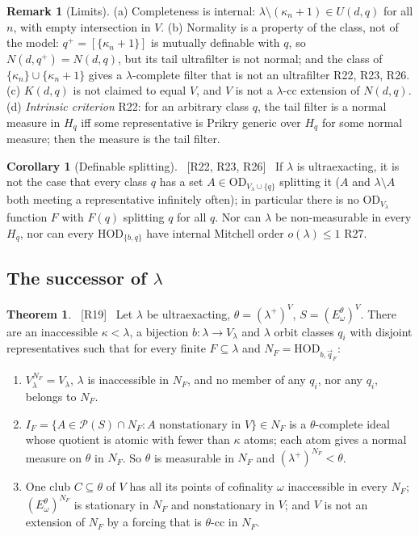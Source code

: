 \documentclass[11pt,letterpaper]{article}
\theoremstyle{definition}
\newtheorem{theorem}[definition]{Theorem}
\newtheorem{corollary}[definition]{Corollary}
\newtheorem{remark}[definition]{Remark}
\numberwithin{equation}{section}
\newcommand{\HOD}{\mathrm{HOD}}
\newcommand{\OD}{\mathrm{OD}}
\newcommand{\Pow}{\mathcal P}
\newcommand{\src}[1]{\unskip\ {\normalfont\small\sffamily\color{Olive}[#1]}\ }
\newcommand{\R}[1]{\textsf{R#1}}
\begin{document}
\begin{remark}[Limits]\label{rem:corelimits}
(a) Completeness is internal: $\lambda\setminus(\kappa_n+1)\in U(d,q)$ for all $n$, with empty intersection in $V$. (b) Normality is a property of the class, not of the model: $q^+=[\{\kappa_n+1\}]$ is mutually definable with $q$, so $N(d,q^+)=N(d,q)$, but its tail ultrafilter is not normal; and the class of $\{\kappa_n\}\cup\{\kappa_n+1\}$ gives a $\lambda$-complete filter that is not an ultrafilter \R{22}, \R{23}, \R{26}. (c) $K(d,q)$ is not claimed to equal $V$, and $V$ is not a $\lambda$-cc extension of $N(d,q)$. (d) \emph{Intrinsic criterion} \R{22}: for an arbitrary class $q$, the tail filter is a normal measure in $H_q$ iff some representative is Prikry generic over $H_q$ for some normal measure; then the measure is the tail filter.
\end{remark}

\begin{corollary}[Definable splitting]\label{cor:split}\src{R22, R23, R26}
If $\lambda$ is ultraexacting, it is not the case that every class $q$ has a set $A\in\OD_{V_\lambda\cup\{q\}}$ splitting it ($A$ and $\lambda\setminus A$ both meeting a representative infinitely often); in particular there is no $\OD_{V_\lambda}$ function $F$ with $F(q)$ splitting $q$ for all $q$. Nor can $\lambda$ be non-measurable in every $H_q$, nor can every $\HOD_{\{b,q\}}$ have internal Mitchell order $o(\lambda)\le1$ \R{27}.
\end{corollary}

\subsection{The successor of $\lambda$}

\begin{theorem}\label{thm:succmeas}\src{R19}
Let $\lambda$ be ultraexacting, $\theta=(\lambda^+)^V$, $S=(E^\theta_\omega)^V$. There are an inaccessible $\kappa<\lambda$, a bijection $b:\lambda\to V_\lambda$ and $\lambda$ orbit classes $q_i$ with disjoint representatives such that for every finite $F\subseteq\lambda$ and $N_F=\HOD_{b,\vec q_F}$:
\begin{enumerate}
\item $V_\lambda^{N_F}=V_\lambda$, $\lambda$ is inaccessible in $N_F$, and no member of any $q_i$, nor any $q_i$, belongs to $N_F$.
\item $I_F=\{A\in\Pow(S)\cap N_F:A\text{ nonstationary in }V\}\in N_F$ is a $\theta$-complete ideal whose quotient is atomic with fewer than $\kappa$ atoms; each atom gives a normal measure on $\theta$ in $N_F$. So $\theta$ is measurable in $N_F$ and $(\lambda^+)^{N_F}<\theta$.
\item One club $C\subseteq\theta$ of $V$ has all its points of cofinality $\omega$ inaccessible in every $N_F$; $(E^\theta_\omega)^{N_F}$ is stationary in $N_F$ and nonstationary in $V$; and $V$ is not an extension of $N_F$ by a forcing that is $\theta$-cc in $N_F$.
\end{enumerate}
\end{theorem}
\end{document}
